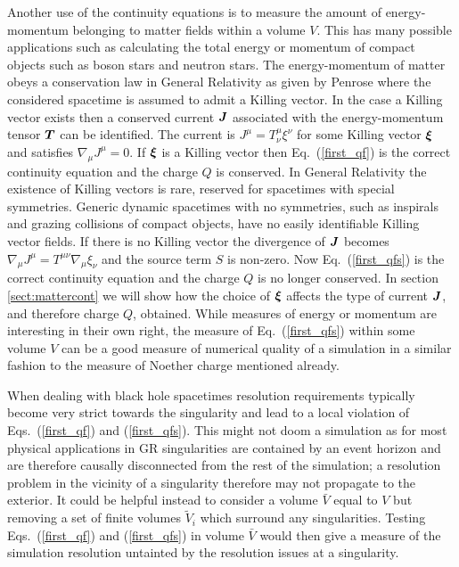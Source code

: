 Another use of the continuity equations is to measure the amount of energy-momentum belonging to matter fields within a volume $V$. This has many possible applications such as calculating the total energy or momentum of compact objects such as boson stars and neutron stars. The energy-momentum of matter obeys a conservation law in General Relativity as given by Penrose \cite{10.2307/2397365} where the considered spacetime is assumed to admit a Killing vector. In the case a Killing vector exists then a conserved current $\boldsymbol{J}$ associated with the energy-momentum tensor $\boldsymbol{T}$ can be identified. The current is $J^\mu = T^\mu_\nu \xi^\nu$ for some Killing vector $\boldsymbol{\xi}$ and satisfies $\nabla_\mu J^\mu = 0$. If $\boldsymbol{\xi}$ is a Killing vector then Eq.~(\ref{first_qf}) is the correct continuity equation and the charge $Q$ is conserved. In General Relativity the existence of Killing vectors is rare, reserved for spacetimes with special symmetries. Generic dynamic spacetimes with no symmetries, such as inspirals and grazing collisions of compact objects, have no easily identifiable Killing vector fields. If there is no Killing vector the divergence of $\boldsymbol{J}$ becomes $\nabla_\mu J^\mu = T^{\mu\nu}\nabla_\mu \xi_\nu$ and the source term ${S}$ is non-zero. Now Eq.~(\ref{first_qfs}) is the correct continuity equation and the charge $Q$ is no longer conserved. In section \ref{sect:mattercont} we will show how the choice of $\boldsymbol{\xi}$ affects the type of current $\boldsymbol{J}$, and therefore charge $Q$, obtained. While measures of energy or momentum are interesting in their own right, the measure of Eq.~(\ref{first_qfs}) within some volume ${V}$ can be a good measure of numerical quality of a simulation in a similar fashion to the measure of Noether charge mentioned already. 

When dealing with black hole spacetimes resolution requirements typically become very strict towards the singularity and lead to a local violation of Eqs.~(\ref{first_qf}) and (\ref{first_qfs}). This might not doom a simulation as for most physical applications in GR singularities are contained by an event horizon and are therefore causally disconnected from the rest of the simulation; a resolution problem in the vicinity of a singularity therefore may not propagate to the exterior. It could be helpful instead to consider a volume $\bar{V}$ equal to $V$ but removing a set of finite volumes $\tilde{V}_i$ which surround any singularities. Testing Eqs.~(\ref{first_qf}) and (\ref{first_qfs}) in volume $\bar{V}$ would then give a measure of the simulation resolution untainted by the resolution issues at a singularity.

